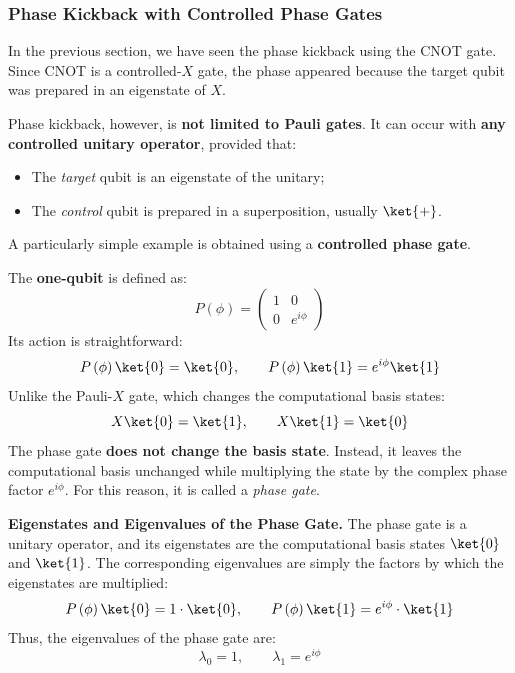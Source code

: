 \subsubsection{Phase Kickback with Controlled Phase Gates}\label{ex:phase-kickback-with-controlled-phase-gates}

In the previous section, we have seen the phase kickback using the CNOT gate. Since CNOT is a controlled-$X$ gate, the phase appeared because the target qubit was prepared in an eigenstate of $X$.

\highspace
Phase kickback, however, is \textbf{not limited to Pauli gates}. It can occur with \textbf{any controlled unitary operator}, provided that:
\begin{itemize}
    \item The \emph{target} qubit is an eigenstate of the unitary;
    \item The \emph{control} qubit is prepared in a superposition, usually $\ket{+}$.
\end{itemize}
A particularly simple example is obtained using a \textbf{controlled phase gate}.

\highspace
The \textbf{one-qubit}  is defined as:
\begin{equation}
    P\left(\phi\right) = \begin{pmatrix}
        1 & 0 \\
        0 & e^{i\phi}
    \end{pmatrix}
\end{equation}
Its action is straightforward:
\begin{equation*}
    P\left(\phi\right)\ket{0} = \ket{0}, \qquad P\left(\phi\right)\ket{1} = e^{i\phi}\ket{1}
\end{equation*}
Unlike the Pauli-$X$ gate, which changes the computational basis states:
\begin{equation*}
    X\ket{0} = \ket{1}, \qquad X\ket{1} = \ket{0}
\end{equation*}
The phase gate \textbf{does not change the basis state}. Instead, it leaves the computational basis unchanged while multiplying the state  by the complex phase factor $e^{i\phi}$. For this reason, it is called a \emph{phase gate}.

\highspace
\textcolor{Green3}{ \textbf{Eigenstates and Eigenvalues of the Phase Gate.}} The phase gate is a unitary operator, and its eigenstates are the computational basis states $\ket{0}$ and $\ket{1}$. The corresponding eigenvalues are simply the factors by which the eigenstates are multiplied:
\begin{equation*}
    P\left(\phi\right)\ket{0} = 1 \cdot \ket{0}, \qquad P\left(\phi\right)\ket{1} = e^{i\phi} \cdot \ket{1}
\end{equation*}
Thus, the eigenvalues of the phase gate are:
\begin{equation*}
    \lambda_0 = 1, \qquad \lambda_1 = e^{i\phi}
\end{equation*}

